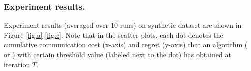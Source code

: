\subsubsection{Experiment results.}
Experiment results (averaged over $10$ runs) on synthetic dataset are shown in Figure
\ref{fig:a}-\ref{fig:c}. 
Note that in the scatter plots, 
each dot denotes the cumulative communication cost (x-axis) and regret (y-axis) that an algorithm (\modelone{} or \modelbaseline{}) with certain threshold value (labeled next to the dot) has obtained at iteration $T$.

\begin{figure}
\centering     %
{}
\vspace{-1mm}
\vspace{-1mm}
{}

\end{figure}
